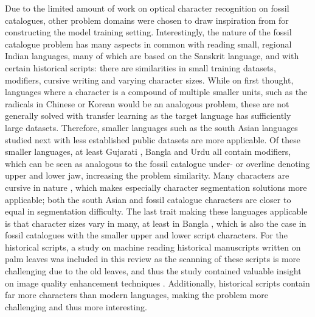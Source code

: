 \documentclass{article}
\begin{document}




Due to the limited amount of work on optical character recognition on fossil catalogues, other 
problem domains were chosen to draw inspiration from for constructing the model training setting. 
Interestingly, the nature of the fossil catalogue problem has many aspects in common with reading small, 
regional Indian languages, many of which are based on the Sanskrit language, and with certain historical 
scripts: there are similarities in small training datasets, modifiers, cursive writing and varying character sizes.
While on first thought, languages where a character is a compound of multiple smaller units, such as the 
radicals in Chinese or Korean would be an analogous problem, these are not generally solved with transfer learning 
as the target language has sufficiently large datasets. Therefore, smaller languages such as the south Asian languages studied next with less established public datasets 
are more applicable.
Of these smaller languages, at least
Gujarati \cite{2limbachiyaGujarati}, Bangla \cite{3chatterjeeBengali} and Urdu \cite{5rasheedHandwrittenUrduWAlexNet} all contain modifiers,
which can be seen as analogous to the fossil catalogue under- or overline denoting upper and lower jaw, increasing the problem similarity.
Many characters are cursive in nature \cite{5rasheedHandwrittenUrduWAlexNet}, which makes especially character segmentation 
solutions more applicable; both the south Asian and fossil catalogue characters are closer to equal in segmentation difficulty.
The last trait making these languages applicable is that character sizes vary in many, at least in Bangla \cite{6shoponBangla}, which 
is also the case in fossil catalogues with the smaller upper and lower script characters.
For the historical scripts, a study on machine reading historical manuscripts written on palm leaves was 
included in this review as the scanning of these scripts is more challenging due to the old leaves, and thus the 
study contained valuable insight on image quality enhancement techniques \cite{9thuonPalm}. Additionally, historical scripts 
contain far more characters than modern languages, making the problem more challenging and thus more interesting.
\end{document}
